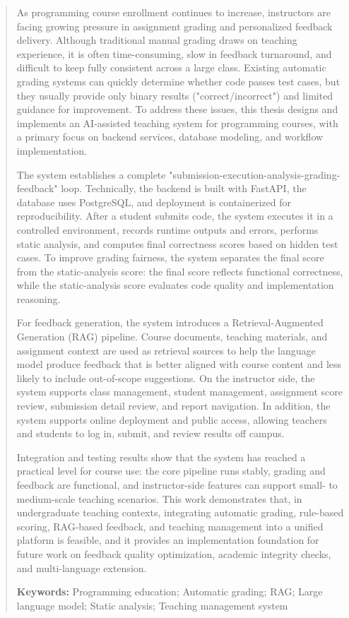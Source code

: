 ﻿\begin{abstract}
As programming course enrollment continues to increase, instructors are facing growing pressure in assignment grading and personalized feedback delivery. Although traditional manual grading draws on teaching experience, it is often time-consuming, slow in feedback turnaround, and difficult to keep fully consistent across a large class. Existing automatic grading systems can quickly determine whether code passes test cases, but they usually provide only binary results ("correct/incorrect") and limited guidance for improvement. To address these issues, this thesis designs and implements an AI-assisted teaching system for programming courses, with a primary focus on backend services, database modeling, and workflow implementation.

The system establishes a complete "submission-execution-analysis-grading-feedback" loop. Technically, the backend is built with FastAPI, the database uses PostgreSQL, and deployment is containerized for reproducibility. After a student submits code, the system executes it in a controlled environment, records runtime outputs and errors, performs static analysis, and computes final correctness scores based on hidden test cases. To improve grading fairness, the system separates the final score from the static-analysis score: the final score reflects functional correctness, while the static-analysis score evaluates code quality and implementation reasoning.

For feedback generation, the system introduces a Retrieval-Augmented Generation (RAG) pipeline. Course documents, teaching materials, and assignment context are used as retrieval sources to help the language model produce feedback that is better aligned with course content and less likely to include out-of-scope suggestions. On the instructor side, the system supports class management, student management, assignment score review, submission detail review, and report navigation. In addition, the system supports online deployment and public access, allowing teachers and students to log in, submit, and review results off campus.

Integration and testing results show that the system has reached a practical level for course use: the core pipeline runs stably, grading and feedback are functional, and instructor-side features can support small- to medium-scale teaching scenarios. This work demonstrates that, in undergraduate teaching contexts, integrating automatic grading, rule-based scoring, RAG-based feedback, and teaching management into a unified platform is feasible, and it provides an implementation foundation for future work on feedback quality optimization, academic integrity checks, and multi-language extension.


\textbf{Keywords:} Programming education; Automatic grading; RAG; Large language model; Static analysis; Teaching management system

\end{abstract}
